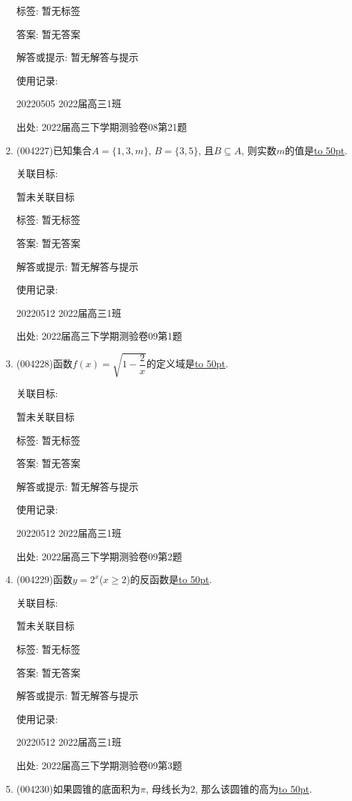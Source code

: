 \documentclass[10pt,a4paper]{article}
\newcommand{\blank}[1]{\underline{\hbox to #1pt{}}}
\begin{document}
\begin{enumerate}[1.]
标签: 暂无标签

答案: 暂无答案

解答或提示: 暂无解答与提示

使用记录:

20220505	2022届高三1班			


出处: 2022届高三下学期测验卷08第21题
\item { (004227)}已知集合$A=\{1,3,m\}$, $B=\{3,5\}$, 且$B\subseteq A$, 则实数$m$的值是\blank{50}.


关联目标:

暂未关联目标



标签: 暂无标签

答案: 暂无答案

解答或提示: 暂无解答与提示

使用记录:

20220512	2022届高三1班	


出处: 2022届高三下学期测验卷09第1题
\item { (004228)}函数$f(x)=\sqrt{1-\dfrac 2x}$的定义域是\blank{50}.


关联目标:

暂未关联目标



标签: 暂无标签

答案: 暂无答案

解答或提示: 暂无解答与提示

使用记录:

20220512	2022届高三1班	


出处: 2022届高三下学期测验卷09第2题
\item { (004229)}函数$y=2^x$($x\ge 2$)的反函数是\blank{50}.


关联目标:

暂未关联目标



标签: 暂无标签

答案: 暂无答案

解答或提示: 暂无解答与提示

使用记录:

20220512	2022届高三1班	


出处: 2022届高三下学期测验卷09第3题
\item { (004230)}如果圆锥的底面积为$\pi$, 母线长为$2$, 那么该圆锥的高为\blank{50}.



\end{enumerate}
\end{document}
